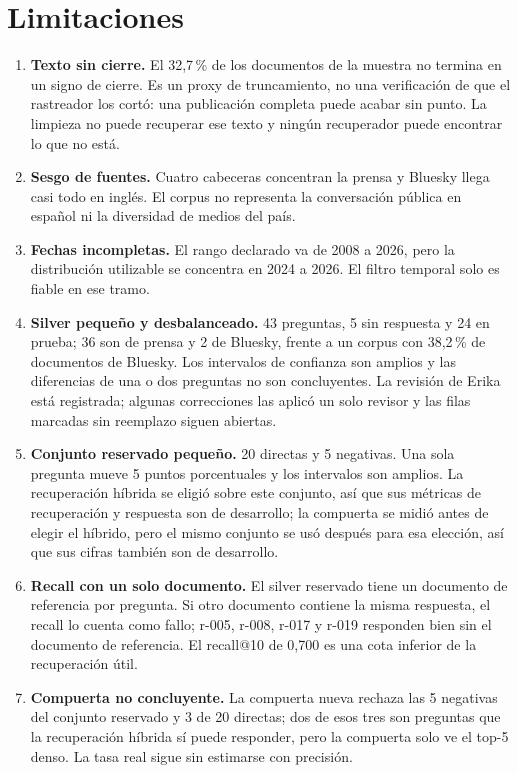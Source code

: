 \section{Limitaciones}
\label{sec:limitaciones}

\begin{enumerate}
\item \textbf{Texto sin cierre.} El 32,7\,\% de los documentos de la muestra no termina en un signo de cierre. Es un proxy de truncamiento, no una verificaci\'on de que el rastreador los cort\'o: una publicaci\'on completa puede acabar sin punto. La limpieza no puede recuperar ese texto y ning\'un recuperador puede encontrar lo que no est\'a.
\item \textbf{Sesgo de fuentes.} Cuatro cabeceras concentran la prensa y Bluesky llega casi todo en ingl\'es. El corpus no representa la conversaci\'on p\'ublica en espa\~nol ni la diversidad de medios del pa\'is.
\item \textbf{Fechas incompletas.} El rango declarado va de 2008 a 2026, pero la distribuci\'on utilizable se concentra en 2024 a 2026. El filtro temporal solo es fiable en ese tramo.
\item \textbf{Silver peque\~no y desbalanceado.} 43 preguntas, 5 sin respuesta y 24 en prueba; 36 son de prensa y 2 de Bluesky, frente a un corpus con 38,2\,\% de documentos de Bluesky. Los intervalos de confianza son amplios y las diferencias de una o dos preguntas no son concluyentes. La revisi\'on de Erika est\'a registrada; algunas correcciones las aplic\'o un solo revisor y las filas marcadas sin reemplazo siguen abiertas.
\item \textbf{Conjunto reservado peque\~no.} 20 directas y 5 negativas. Una sola pregunta mueve 5 puntos porcentuales y los intervalos son amplios. La recuperaci\'on h\'ibrida se eligi\'o sobre este conjunto, as\'i que sus m\'etricas de recuperaci\'on y respuesta son de desarrollo; la compuerta se midi\'o antes de elegir el h\'ibrido, pero el mismo conjunto se us\'o despu\'es para esa elecci\'on, as\'i que sus cifras tambi\'en son de desarrollo.
\item \textbf{Recall con un solo documento.} El silver reservado tiene un documento de referencia por pregunta. Si otro documento contiene la misma respuesta, el recall lo cuenta como fallo; r-005, r-008, r-017 y r-019 responden bien sin el documento de referencia. El recall@10 de 0,700 es una cota inferior de la recuperaci\'on \'util.
\item \textbf{Compuerta no concluyente.} La compuerta nueva rechaza las 5 negativas del conjunto reservado y 3 de 20 directas; dos de esos tres son preguntas que la recuperaci\'on h\'ibrida s\'i puede responder, pero la compuerta solo ve el top-5 denso. La tasa real sigue sin estimarse con precisi\'on.

\end{enumerate}
